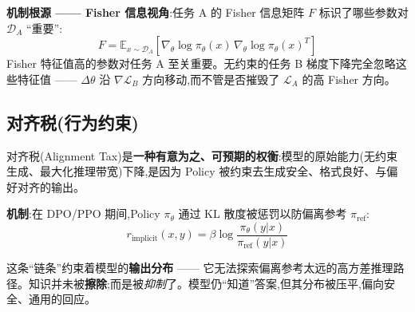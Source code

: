 \textbf{机制根源 —— Fisher 信息视角}:任务 A 的 Fisher 信息矩阵 $F$ 标识了哪些参数对 $\mathcal{D}_A$ “重要”:
\begin{equation}
F = \mathbb{E}_{x \sim \mathcal{D}_A}\!\left[\nabla_\theta \log \pi_\theta(x)\, \nabla_\theta \log \pi_\theta(x)^T\right]
\end{equation}
 Fisher 特征值高的参数对任务 A 至关重要。无约束的任务 B 梯度下降完全忽略这些特征值 —— $\Delta\theta$ 沿 $\nabla\mathcal{L}_B$ 方向移动,而不管是否摧毁了 $\mathcal{L}_A$ 的高 Fisher 方向。

\subsection{对齐税(行为约束)}
\label{alignment-tax-behavioral-constraint}

对齐税(Alignment Tax)是\textbf{一种有意为之、可预期的权衡}:模型的原始能力(无约束生成、最大化推理带宽)下降,是因为 Policy 被约束去生成安全、格式良好、与偏好对齐的输出。

\textbf{机制}:在 DPO/PPO 期间,Policy $\pi_\theta$ 通过 KL 散度被惩罚以防偏离参考 $\pi_{\text{ref}}$:
\begin{equation}
r_{\text{implicit}}(x, y) = \beta \log \frac{\pi_\theta(y|x)}{\pi_{\text{ref}}(y|x)}
\end{equation}

这条“链条”约束着模型的\textbf{输出分布} —— 它无法探索偏离参考太远的高方差推理路径。知识并未被\textbf{擦除};而是被\emph{抑制}了。模型仍“知道”答案,但其分布被压平,偏向安全、通用的回应。


